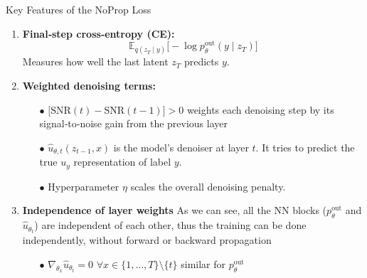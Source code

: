 \documentclass{beamer}
\begin{document}
\begin{frame}{Key Features of the NoProp Loss}
\begin{enumerate}
  \item {\bf Final‐step cross‐entropy (CE):}
    \[
      \mathbb{E}_{q(z_T\mid y)}\bigl[-\log p_{\theta}^{\mathrm{out}}(y\mid z_T)\bigr]
    \]
    Measures how well the last latent $z_T$ predicts $y$.


  \item {\bf Weighted denoising terms:}
    \begin{itemize}
      \item[$\bullet$] $\big[\mathrm{SNR}(t)-\mathrm{SNR}(t-1) \big] > 0$ weights each denoising step by its signal‐to‐noise gain from the previous layer
      \item[$\bullet$] $\hat u_{\theta,t}(z_{t-1},x)$ is the model's denoiser at layer $t$. It tries to predict the true $u_y$ representation of label $y$.
      \item[$\bullet$] Hyperparameter $\eta$ scales the overall denoising penalty.
    \end{itemize}

  \item {\bf Independence of layer weights} As we can see, all the NN blocks ($p_\theta^{\text{out}}$ and $\hat u_{\theta_t}$) are independent of each other, thus the training can be done independently, without forward or backward propagation

  \begin{itemize}
      \item[$\bullet$] $\nabla_{\theta_x} \hat u_{\theta_t} = 0$  $\forall x \in \{1, \dots, T\} \setminus \{t\}$ similar for $p_\theta^{\text{out}}$ 

\end{itemize}

\end{enumerate}
\end{frame}
\end{document}
